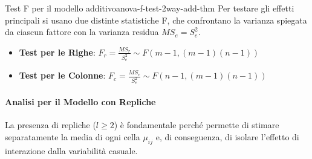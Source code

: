 \begin{table}[ht]
    \centering
    \caption{Tabella ANOVA a due fattori (caso senza repliche) - Test di
    Ipotesi}
\end{table}
\begin{teorema}{Test F per il modello additivo}{anova-f-test-2way-add-thm}
Per testare gli effetti principali si usano due distinte statistiche F, che
confrontano la varianza spiegata da ciascun fattore con la varianza residua
\(MS_e = S_e^2\).
\begin{itemize}
    \item \textbf{Test per le Righe}: \( F_r = \frac{MS_r}{S_e^2} \sim F(m-1,
    (m-1)(n-1))\)
    \item \textbf{Test per le Colonne}: \( F_c = \frac{MS_c}{S_e^2} \sim F(n-1,
    (m-1)(n-1))\)
\end{itemize}
\end{teorema}

\paragraph{Analisi per il Modello con Repliche}
La presenza di repliche (\(l \ge 2\)) è fondamentale perché permette di
stimare separatamente la media di ogni cella \(\mu_{ij}\) e, di conseguenza, di
isolare l'effetto di interazione dalla variabilità casuale.

